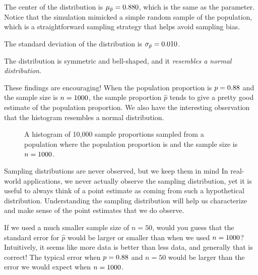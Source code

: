 \begin{description}
\setlength{\itemsep}{0mm}
\item[Center.]
    The center of the distribution is
    $\mu_{\hat{p}} = 0.88{}0$,
    which is the same as the parameter.
    Notice that the simulation mimicked a simple random sample
    of the population, which is a straightforward sampling
    strategy that helps avoid sampling bias.
\item[Spread.]
    The standard deviation of the distribution
    is $\sigma_{\hat{p}} = 0.010{}$.
  
\item[Shape.]
    The distribution is symmetric and bell-shaped,
    and it \emph{resembles a normal distribution}.
\end{description}
These findings are encouraging!
When the population
proportion is $p = 0.88{}$ and the sample size is
$n = 1000{}$,
the sample proportion $\hat{p}$ tends to give
a pretty good estimate
of the population proportion.
We also have the interesting observation
that the histogram resembles a normal distribution.

\begin{figure}[h]
   \centering
   \caption{A histogram of 10,000 sample proportions sampled from a population where the population
       proportion is \pewsolarparprop{} and the sample size is
       $n = 1000{}$.}
   \label{sampling_10k_prop_88p}
\end{figure}

\begin{onebox}{Sampling distributions are
    never observed, but we keep them in mind}
  In real-world applications, we never actually observe the
  sampling distribution, yet it is useful to always think of
  a point estimate as coming from such a hypothetical
  distribution.
  \mbox{Understanding} the sampling distribution will help us
  characterize and make sense of the point estimates that we
  do observe.
\end{onebox}

\begin{examplewrap}
\begin{nexample}{If we used a much smaller sample size of $n = 50$,
would you guess that the standard error for $\hat{p}$ would be larger
or smaller than when we used $n = 1000{}$?}
\label{smallerSampleWhatHappensToPropErrorExercise}
Intuitively, it seems like more data is better
than less data, and generally that is correct! The typical error
when $p = 0.88{}$ and $n = 50$ would be larger
than the error we would expect when $n = 1000{}$.
\end{nexample}
\end{examplewrap}

